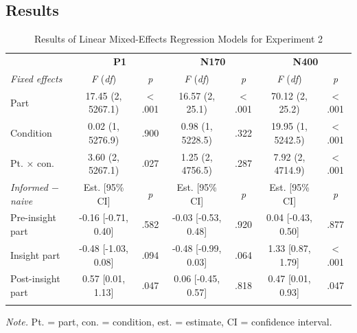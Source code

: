 \documentclass[
  english,
  doc,12pt,twoside,floatsintext]{apa7}
\begin{document}
\hypertarget{results-1}{%
\subsection{Results}\label{results-1}}

\begin{table}[tbp]

\begin{center}
\begin{threeparttable}

\caption{\label{tab:exp2-table}Results of Linear Mixed-Effects Regression Models for Experiment 2\smallskip}

\footnotesize{

\begin{tabular}{lcccccc}
\toprule
 & \multicolumn{2}{c}{\textbf{P1}} & \multicolumn{2}{c}{\textbf{N170}} & \multicolumn{2}{c}{\textbf{N400}} \\
\cmidrule(r){2-3} \cmidrule(r){4-5} \cmidrule(r){6-7}
\textit{Fixed effects} & \textit{F} (\textit{df}) & \textit{p} & \textit{F} (\textit{df}) & \textit{p} & \textit{F} (\textit{df}) & \textit{p}\\
\midrule
Part & 17.45 (2, 5267.1) & < .001 & 16.57 (2, 25.1) & < .001 & 70.12 (2, 25.2) & < .001\\
Condition & 0.02 (1, 5276.9) & .900 & 0.98 (1, 5228.5) & .322 & 19.95 (1, 5242.5) & < .001\\
Pt. × con. & 3.60 (2, 5267.1) & .027 & 1.25 (2, 4756.5) & .287 & 7.92 (2, 4714.9) & < .001\\
\textit{Informed $-$  naive} & Est. [95\% CI] & \textit{p} & Est. [95\% CI] & \textit{p} & Est. [95\% CI] & \textit{p}\\ \midrule
Pre-insight part & -0.16 [-0.71, 0.40] & .582 & -0.03 [-0.53, 0.48] & .920 & 0.04 [-0.43, 0.50] & .877\\
Insight part & -0.48 [-1.03, 0.08] & .094 & -0.48 [-0.99, 0.03] & .064 & 1.33 [0.87, 1.79] & < .001\\
Post-insight part & 0.57 [0.01, 1.13] & .047 & 0.06 [-0.45, 0.57] & .818 & 0.47 [0.01, 0.93] & .047\\
\bottomrule
\addlinespace
\end{tabular}

}

\begin{tablenotes}[para]
\normalsize{\textit{Note.} Pt. = part, con. = condition, est. = estimate, CI = confidence interval.}
\end{tablenotes}

\end{threeparttable}
\end{center}

\end{table}
\end{document}
